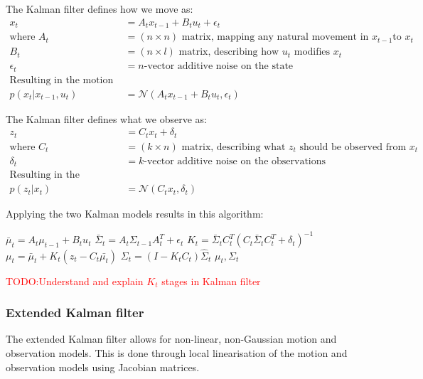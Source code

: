 \documentclass{article}
\makeatletter
\newcommand{\todo}[1]{\textcolor{red}{TODO:\@ #1}}
\makeatother
\begin{document}
The Kalman filter defines how we move as:
\begin{align*}
  x_t &= A_t x_{t-1} + B_t u_t + \epsilon_t \\
  \text{where }
  A_t &= \text{$(n \times n)$ matrix, mapping any natural movement in $x_{t-1}$
    to $x_t$} \\
  B_t &= \text{$(n \times l)$ matrix, describing how $u_t$ modifies $x_t$} \\
  \epsilon_t &= \text{$n$-vector additive noise on the state} \\
  \text{Resulting in the motion model:} \\
  p(x_t \vert x_{t-1}, u_t) &= \mathcal{N}(A_t x_{t-1} + B_t u_t, \epsilon_t)
\end{align*}

The Kalman filter defines what we observe as:
\begin{align*}
  z_t &= C_t x_t + \delta_t \\
  \text{where }
  C_t &= \text{$(k \times n)$ matrix, describing what $z_t$ should be
    observed from $x_t$} \\
  \delta_t &= \text{$k$-vector additive noise on the observations} \\
  \text{Resulting in the observation model:} \\
  p(z_t \vert x_t) &= \mathcal{N}(C_t x_t, \delta_t)
\end{align*}

Applying the two Kalman models results in this algorithm:
\begin{algorithmic}[1]
    \State$\bar{\mu}_t = A_t \mu_{t-1} + B_t u_t$
    \State$\bar{\Sigma}_t = A_t \Sigma_{t-1}A_t^T + \epsilon_t$
    \State$K_t =
      \bar{\Sigma}_t C_t^T{(C_t \bar{\Sigma}_t C_t^T + \delta_t)}^{-1}$
    \State$\mu_t = \bar{\mu}_t + K_t(z_t - C_t \bar{\mu_t})$
    \State$\Sigma_t = (I - K_t C_t)\hat{\Sigma}_t$
    \State\Return$\mu_t, \Sigma_t$
  \EndProcedure{}
\end{algorithmic}

\todo{Understand and explain $K_t$ stages in Kalman filter}

\subsubsection{Extended Kalman filter}

The extended Kalman filter allows for non-linear, non-Gaussian motion and
observation models. This is done through local linearisation of the motion and
observation models using Jacobian matrices.
\end{document}
